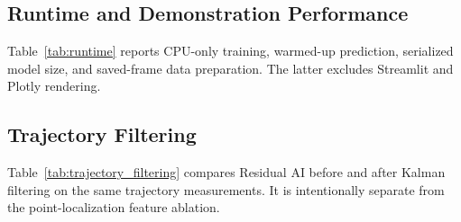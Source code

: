 \subsection{Runtime and Demonstration Performance}
Table~\ref{tab:runtime} reports CPU-only training, warmed-up prediction,
serialized model size, and saved-frame data preparation. The latter excludes
Streamlit and Plotly rendering.


\subsection{Trajectory Filtering}
Table~\ref{tab:trajectory_filtering} compares Residual AI before and after
Kalman filtering on the same trajectory measurements. It is intentionally
separate from the point-localization feature ablation.

